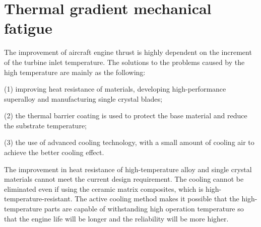 
\section{Thermal gradient mechanical fatigue}
\noindent
The improvement of aircraft engine thrust is highly dependent on the increment of the turbine inlet temperature.
The solutions to the problems caused by the high temperature are mainly as the following:

(1) improving heat resistance of materials, developing high-performance superalloy and manufacturing single crystal blades;

(2) the thermal barrier coating is used to protect the base material and reduce the substrate temperature;

(3) the use of advanced cooling technology, with a small amount of cooling air to achieve the better cooling effect.

The improvement in heat resistance of high-temperature alloy and single crystal materials cannot meet the current design requirement. The cooling cannot be eliminated even if using the ceramic matrix composites, which is high-temperature-resistant. The active cooling method makes it possible that the high-temperature parts are capable of withstanding high operation temperature so that the engine life will be longer and the reliability will be more higher.

